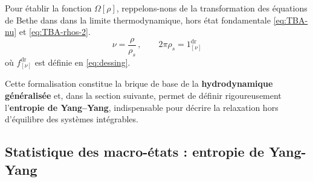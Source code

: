 
\medskip
Pour établir la fonction $\Omega[\rho]$, reppelons-nons de la transformation des équations de Bethe dans dans la limite thermodynamique, hors état fondamentale \eqref{eq:TBA-nu} et \eqref{eq:TBA-rhos-2}.
\begin{equation}
	\nu = \frac{\rho}{\rho_s} \, , \qquad 2\pi \rho_s = 1^{\mathrm{dr}}_{[\nu]} 
\label{chap.2:eq:TBA-rhos}
\end{equation}
où $f^{\mathrm{dr}}_{[\nu]}$ est définie en \eqref{eq:dessing}.

\medskip

Cette formalisation constitue la brique de base de la \textbf{hydrodynamique généralisée} et, dans la section suivante, permet de définir rigoureusement l’\textbf{entropie de Yang–Yang}, indispensable pour décrire la relaxation hors d’équilibre des systèmes intégrables.


%



\subsection{Statistique des macro-états : entropie de Yang-Yang}


